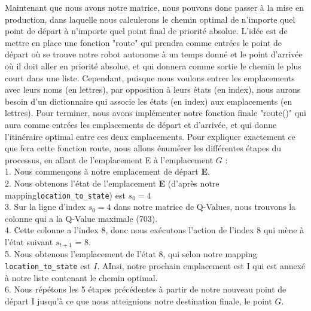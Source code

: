 \documentclass{article}
\begin{document}
Maintenant que nous avons notre matrice, nous pouvons donc passer à la mise en production, dans laquelle nous calculerons le chemin optimal de n'importe quel point de départ à n'importe quel point final de priorité absolue. L'idée est de mettre en place une fonction "route" qui prendra comme entrées le point de départ où se trouve notre robot autonome à un temps donné et le point d'arrivée où il doit aller en priorité absolue, et qui donnera comme sortie le chemin le plus court dans une liste. Cependant, puisque nous voulons entrer les emplacements avec leurs noms (en lettres), par opposition à leurs états (en index), nous aurons besoin d'un dictionnaire qui associe les états (en index) aux emplacements (en lettres). Pour terminer, nous avons implémenter notre fonction finale "route()" qui aura comme entrées les emplacements de départ et d'arrivée, et qui donne l'itinéraire optimal entre ces deux emplacements. Pour expliquer exactement ce que fera cette fonction route, nous allons énumérer les différentes étapes du processus, en allant de l'emplacement E à l'emplacement $G$ :\\
1. Nous commençons à notre emplacement de départ \textbf{E}.\\
2. Nous obtenons l'état de l'emplacement  \textbf{E} (d'après notre mapping\texttt{location\_to\_state}) est $s_0 = 4$\\
3. Sur la ligne d'index $s_0 = 4$ dans notre matrice de Q-Values, nous trouvons la colonne qui a la Q-Value maximale (703).\\
4. Cette colonne a l'index 8, donc nous exécutons l'action de l'index 8 qui mène à l'état suivant $s_{t+1}$ = 8.\\
5. Nous obtenons l'emplacement de l'état 8, qui selon notre mapping \texttt{location\_to\_state} est $I$. AInsi, notre prochain emplacement est I qui est annexé à notre liste contenant le chemin optimal.\\
6. Nous répétons les 5 étapes précédentes à partir de notre nouveau point de départ I jusqu'à ce que nous atteignions notre destination finale, le point $G$.\\
\end{document}
